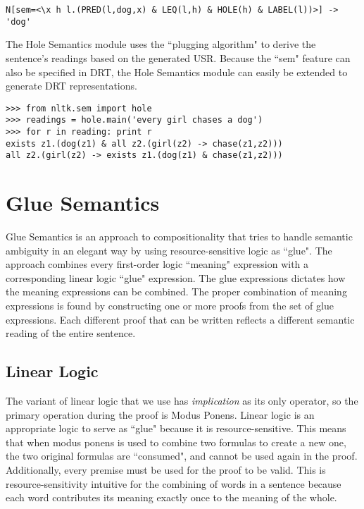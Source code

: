 \documentclass{article}
\begin{document}
\small
\begin{verbatim}
N[sem=<\x h l.(PRED(l,dog,x) & LEQ(l,h) & HOLE(h) & LABEL(l))>] -> 'dog'
\end{verbatim}
\normalsize

The Hole Semantics module uses the ``plugging algorithm" to derive the sentence's readings based on the generated USR.  Because the ``sem" feature can also be specified in DRT, the Hole Semantics module can easily be extended to generate DRT representations.

\begin{verbatim}
>>> from nltk.sem import hole
>>> readings = hole.main('every girl chases a dog')
>>> for r in reading: print r
exists z1.(dog(z1) & all z2.(girl(z2) -> chase(z1,z2)))
all z2.(girl(z2) -> exists z1.(dog(z1) & chase(z1,z2)))
\end{verbatim}


\section{Glue Semantics}
Glue Semantics is an approach to compositionality that tries to handle semantic ambiguity in an elegant way by using resource-sensitive logic as ``glue".  The approach combines every first-order logic ``meaning" expression with a corresponding linear logic ``glue" expression.  The glue expressions dictates how the meaning expressions can be combined.  The proper combination of meaning expressions is found by constructing one or more proofs from the set of glue expressions.  Each different proof that can be written reflects a different semantic reading of the entire sentence.  

\subsection{Linear Logic}
The variant of linear logic that we use has \emph{implication} as its only operator, so the primary operation during the proof is Modus Ponens.  Linear logic is an appropriate logic to serve as ``glue" because it is resource-sensitive.  This means that when modus ponens is used to combine two formulas to create a new one, the two original formulas are ``consumed", and cannot be used again in the proof.  Additionally, every premise must be used for the proof to be valid.  This is resource-sensitivity intuitive for the combining of words in a sentence because each word contributes its meaning exactly once to the meaning of the whole.
\end{document}
